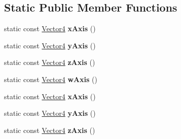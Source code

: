 \subsection*{Static Public Member Functions}
\begin{DoxyCompactItemize}
\item 
\hypertarget{classVectormath_1_1Aos_1_1Vector4_ab91a493c58eea40c5a0ceb42643bbf5d}{static const \hyperlink{classVectormath_1_1Aos_1_1Vector4}{Vector4} {\bfseries x\-Axis} ()}\label{classVectormath_1_1Aos_1_1Vector4_ab91a493c58eea40c5a0ceb42643bbf5d}

\item 
\hypertarget{classVectormath_1_1Aos_1_1Vector4_ae28b3a5c316e7b16f291ff66d6f0a575}{static const \hyperlink{classVectormath_1_1Aos_1_1Vector4}{Vector4} {\bfseries y\-Axis} ()}\label{classVectormath_1_1Aos_1_1Vector4_ae28b3a5c316e7b16f291ff66d6f0a575}

\item 
\hypertarget{classVectormath_1_1Aos_1_1Vector4_ad4c1cb17374e01df633a07edbc53614d}{static const \hyperlink{classVectormath_1_1Aos_1_1Vector4}{Vector4} {\bfseries z\-Axis} ()}\label{classVectormath_1_1Aos_1_1Vector4_ad4c1cb17374e01df633a07edbc53614d}

\item 
\hypertarget{classVectormath_1_1Aos_1_1Vector4_aa0cca371322535f44fd29d0be5525afa}{static const \hyperlink{classVectormath_1_1Aos_1_1Vector4}{Vector4} {\bfseries w\-Axis} ()}\label{classVectormath_1_1Aos_1_1Vector4_aa0cca371322535f44fd29d0be5525afa}

\item 
\hypertarget{classVectormath_1_1Aos_1_1Vector4_ac6b4788fd011f0153aff4debca27243e}{static const \hyperlink{classVectormath_1_1Aos_1_1Vector4}{Vector4} {\bfseries x\-Axis} ()}\label{classVectormath_1_1Aos_1_1Vector4_ac6b4788fd011f0153aff4debca27243e}

\item 
\hypertarget{classVectormath_1_1Aos_1_1Vector4_ab32787000390d1bdda06b5814289b3d8}{static const \hyperlink{classVectormath_1_1Aos_1_1Vector4}{Vector4} {\bfseries y\-Axis} ()}\label{classVectormath_1_1Aos_1_1Vector4_ab32787000390d1bdda06b5814289b3d8}

\item 
\hypertarget{classVectormath_1_1Aos_1_1Vector4_a7e8759f580cc05d0f4c215feaea92761}{static const \hyperlink{classVectormath_1_1Aos_1_1Vector4}{Vector4} {\bfseries z\-Axis} ()}\label{classVectormath_1_1Aos_1_1Vector4_a7e8759f580cc05d0f4c215feaea92761}


\end{DoxyCompactItemize}
